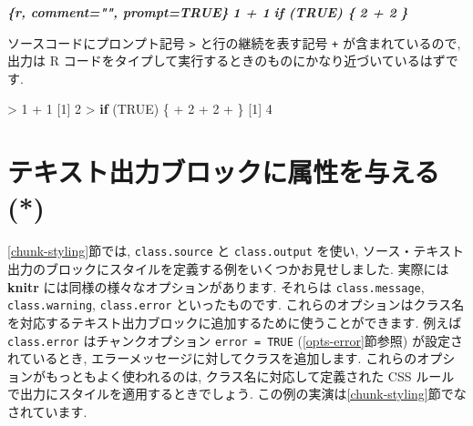 \documentclass[
  11pt,
  lualatex,
  ja=standard]{bxjsreport}
\newenvironment{Shaded}{\begin{snugshade}}{\end{snugshade}}
\newcommand{\ConstantTok}[1]{\textcolor[rgb]{0.00,0.00,0.00}{#1}}
\newcommand{\ControlFlowTok}[1]{\textcolor[rgb]{0.13,0.29,0.53}{\textbf{#1}}}
\newcommand{\DecValTok}[1]{\textcolor[rgb]{0.00,0.00,0.81}{#1}}
\newcommand{\InformationTok}[1]{\textcolor[rgb]{0.56,0.35,0.01}{\textbf{\textit{#1}}}}
\newcommand{\NormalTok}[1]{#1}
\newcommand{\SpecialCharTok}[1]{\textcolor[rgb]{0.00,0.00,0.00}{#1}}
\begin{document}
\begin{Shaded}
\begin{Highlighting}[]
\InformationTok{\textasciigrave{}\textasciigrave{}\textasciigrave{}\{r, comment="", prompt=TRUE\}}
\InformationTok{1 + 1}
\InformationTok{if (TRUE) \{}
\InformationTok{  2 + 2}
\InformationTok{\}}
\InformationTok{\textasciigrave{}\textasciigrave{}\textasciigrave{}}
\end{Highlighting}
\end{Shaded}

ソースコードにプロンプト記号 \texttt{\textgreater{}} と行の継続を表す記号 \texttt{+} が含まれているので, 出力は R コードをタイプして実行するときのものにかなり近づいているはずです.

\begin{Shaded}
\begin{Highlighting}[numbers=left,,]
\SpecialCharTok{\textgreater{}} \DecValTok{1} \SpecialCharTok{+} \DecValTok{1}
\NormalTok{[}\DecValTok{1}\NormalTok{] }\DecValTok{2}
\SpecialCharTok{\textgreater{}} \ControlFlowTok{if}\NormalTok{ (}\ConstantTok{TRUE}\NormalTok{) \{}
\SpecialCharTok{+}   \DecValTok{2} \SpecialCharTok{+} \DecValTok{2}
\SpecialCharTok{+}\NormalTok{ \}}
\NormalTok{[}\DecValTok{1}\NormalTok{] }\DecValTok{4}
\end{Highlighting}
\end{Shaded}

\hypertarget{attr-output}{%
\section{テキスト出力ブロックに属性を与える (*)}\label{attr-output}}

\ref{chunk-styling}節では, \texttt{class.source} と \texttt{class.output} を使い, ソース・テキスト出力のブロックにスタイルを定義する例をいくつかお見せしました. 実際には \textbf{knitr} には同様の様々なオプションがあります. それらは \texttt{class.message}, \texttt{class.warning}, \texttt{class.error} といったものです. これらのオプションはクラス名を対応するテキスト出力ブロックに追加するために使うことができます. 例えば \texttt{class.error} はチャンクオプション \texttt{error = TRUE} (\ref{opts-error}節参照) が設定されているとき, エラーメッセージに対してクラスを追加します. これらのオプションがもっともよく使われるのは, クラス名に対応して定義された CSS ルールで出力にスタイルを適用するときでしょう. この例の実演は\ref{chunk-styling}節でなされています.
\end{document}
